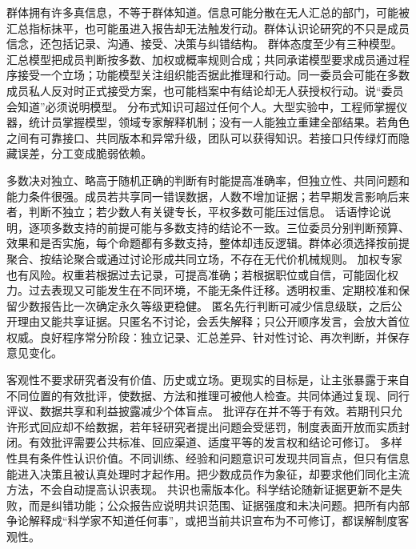 群体拥有许多真信息，不等于群体知道。信息可能分散在无人汇总的部门，可能被汇总指标抹平，也可能虽进入报告却无法触发行动。群体认识论研究的不只是成员信念，还包括记录、沟通、接受、决策与纠错结构。 群体态度至少有三种模型。汇总模型把成员判断按多数、加权或概率规则合成；共同承诺模型要求成员通过程序接受一个立场；功能模型关注组织能否据此推理和行动。同一委员会可能在多数成员私人反对时正式接受方案，也可能档案中有结论却无人获授权行动。说“委员会知道”必须说明模型。 分布式知识可超过任何个人。大型实验中，工程师掌握仪器，统计员掌握模型，领域专家解释机制；没有一人能独立重建全部结果。若角色之间有可靠接口、共同版本和异常升级，团队可以获得知识。若接口只传绿灯而隐藏误差，分工变成脆弱依赖。

多数决对独立、略高于随机正确的判断有时能提高准确率，但独立性、共同问题和能力条件很强。成员若共享同一错误数据，人数不增加证据；若早期发言影响后来者，判断不独立；若少数人有关键专长，平权多数可能压过信息。 话语悖论说明，逐项多数支持的前提可能与多数支持的结论不一致。三位委员分别判断预算、效果和是否实施，每个命题都有多数支持，整体却违反逻辑。群体必须选择按前提聚合、按结论聚合或通过讨论形成共同立场，不存在无代价机械规则。 加权专家也有风险。权重若根据过去记录，可提高准确；若根据职位或自信，可能固化权力。过去表现又可能发生在不同环境，不能无条件迁移。透明权重、定期校准和保留少数报告比一次确定永久等级更稳健。 匿名先行判断可减少信息级联，之后公开理由又能共享证据。只匿名不讨论，会丢失解释；只公开顺序发言，会放大首位权威。良好程序常分阶段：独立记录、汇总差异、针对性讨论、再次判断，并保存意见变化。

客观性不要求研究者没有价值、历史或立场。更现实的目标是，让主张暴露于来自不同位置的有效批评，使数据、方法和推理可被他人检查。共同体通过复现、同行评议、数据共享和利益披露减少个体盲点\parencite{longino1990}。 批评存在并不等于有效。若期刊只允许形式回应却不给数据，若年轻研究者提出问题会受惩罚，制度表面开放而实质封闭。有效批评需要公共标准、回应渠道、适度平等的发言权和结论可修订。 多样性具有条件性认识价值。不同训练、经验和问题意识可发现共同盲点，但只有信息能进入决策且被认真处理时才起作用。把少数成员作为象征，却要求他们同化主流方法，不会自动提高认识表现。 共识也需版本化。科学结论随新证据更新不是失败，而是纠错功能；公众报告应说明共识范围、证据强度和未决问题。把所有内部争论解释成“科学家不知道任何事”，或把当前共识宣布为不可修订，都误解制度客观性。

